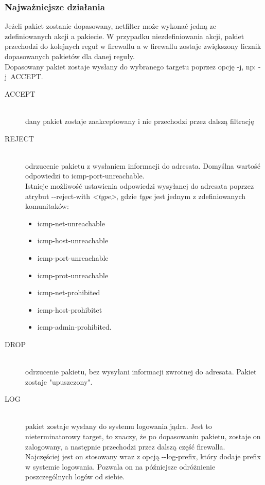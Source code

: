 \documentclass[a4paper,12pt]{book}
\newcommand{\param}[1]{\textit{\textless #1\textgreater}}
\begin{document}
			\subsubsection{Najważniejsze działania}
				Jeżeli pakiet zostanie dopasowany, netfilter może wykonać jedną ze zdefiniowanych akcji a pakiecie. W przypadku niezdefiniowania akcji, pakiet przechodzi do kolejnych reguł w firewallu a w firewallu zostaje zwiększony licznik dopasowanych pakietów dla danej reguły.\\
				Dopasowany pakiet zostaje wysłany do wybranego targetu poprzez opcję -j, np: -j~ACCEPT.
				\begin{description}
					\item[ACCEPT] \hfill \\
						dany pakiet zostaje zaakceptowany i nie przechodzi przez dalszą filtrację
					\item[REJECT] \hfill \\
						odrzucenie pakietu z wysłaniem informacji do adresata. Domyślna wartość odpowiedzi to icmp-port-unreachable.\\
						Istnieje możliwość ustawienia odpowiedzi wysyłanej do adresata poprzez atrybut -{}-reject-with \param{type},
						gdzie \textit{type} jest jednym z zdefiniowanych komunitaków:
						\begin{itemize}
							\item icmp-net-unreachable
							\item icmp-host-unreachable
							\item icmp-port-unreachable
							\item icmp-prot-unreachable
							\item icmp-net-prohibited
							\item icmp-host-prohibitet
							\item icmp-admin-prohibited.
						\end{itemize}
					\item[DROP] \hfill \\
						odrzucenie pakietu, bez wysyłani informacji zwrotnej do adresata. Pakiet zostaje "upuszczony".
					\item[LOG] \hfill \\
						pakiet zostaje wysłany do systemu logowania jądra. Jest to nieterminatorowy target, to znaczy, że po dopasowaniu pakietu, zostaje on zalogowany, a następnie przechodzi przez dalszą część firewalla.\\
						Najczęściej jest on stosowany wraz z opcją -{}-log-prefix, który dodaje prefix w systemie logowania. Pozwala on na późniejsze odróżnienie poszczególnych logów od siebie.

\end{description}
\end{document}
